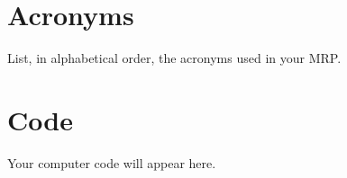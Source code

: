 \documentclass[undefended]{bumrp}
\begin{document}
%
%
%

\backmatter%
	
	


\begin{appendices}
\chapter{Acronyms}

List, in alphabetical order, the acronyms used in your MRP.

\chapter{Code}
	
Your computer code will appear here.	
	
\end{appendices}
\end{document}
